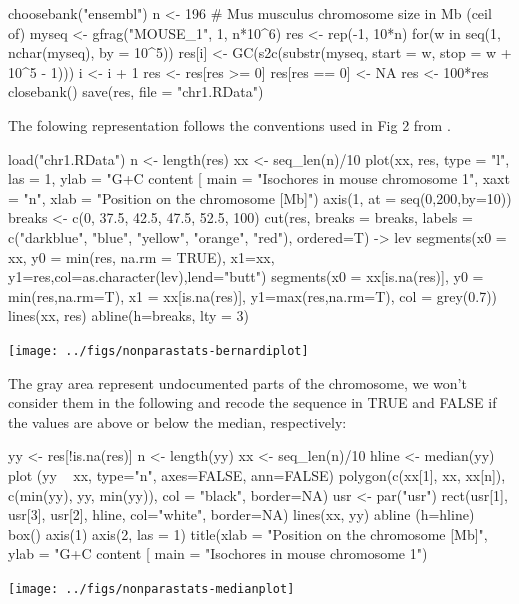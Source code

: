 \documentclass{article}
\begin{document}
%
%
\begin{Schunk}
\begin{Sinput}
 choosebank("ensembl")
 n <- 196 # Mus musculus chromosome size in Mb (ceil of)
 myseq <- gfrag("MOUSE_1", 1, n*10^6)
 res <- rep(-1, 10*n)
 for(w in seq(1, nchar(myseq), by = 10^5)){
   res[i] <- GC(s2c(substr(myseq, start = w, stop = w + 10^5 - 1)))
   i <- i + 1
 }
 res <- res[res >= 0]
 res[res == 0] <- NA
 res <- 100*res
 closebank()
 save(res, file = "chr1.RData")
\end{Sinput}
\end{Schunk}

The folowing representation follows the conventions used in Fig 2 from \cite{PacesJ2004}.

\begin{Schunk}
\begin{Sinput}
 load("chr1.RData")
 n <- length(res)
 xx <- seq_len(n)/10
 plot(xx, res, type = "l", las = 1,
 ylab = "G+C content [%
 main = "Isochores in mouse chromosome 1", xaxt = "n",
 xlab = "Position on the chromosome [Mb]")
 axis(1, at = seq(0,200,by=10))
 breaks <- c(0, 37.5, 42.5, 47.5, 52.5, 100)
 cut(res, breaks = breaks, 
 labels = c("darkblue", "blue", "yellow", "orange", "red"),
 ordered=T) -> lev
 segments(x0 = xx, y0 = min(res, na.rm = TRUE), x1=xx, y1=res,col=as.character(lev),lend="butt")
 segments(x0 = xx[is.na(res)], y0 = min(res,na.rm=T), x1 = xx[is.na(res)], y1=max(res,na.rm=T),
 col = grey(0.7))
 lines(xx, res)
 abline(h=breaks, lty = 3)
\end{Sinput}
\end{Schunk}
\texttt{[image: ../figs/nonparastats-bernardiplot]}

The gray area represent undocumented parts of the chromosome, we won't
consider them in the following and recode the sequence in TRUE and FALSE
if the values are above or below the median, respectively:

\begin{Schunk}
\begin{Sinput}
 yy <- res[!is.na(res)]
 n <- length(yy)
 xx <- seq_len(n)/10
 hline <- median(yy)
 plot (yy ~ xx, type="n", axes=FALSE, ann=FALSE)
 polygon(c(xx[1], xx, xx[n]), c(min(yy), yy, min(yy)), col = "black", border=NA)
 usr <- par("usr")
 rect(usr[1], usr[3], usr[2], hline, col="white", border=NA)
 lines(xx, yy)
 abline (h=hline)
 box()
 axis(1)
 axis(2, las = 1) 
 title(xlab = "Position on the chromosome [Mb]", ylab = "G+C content [%
 main = "Isochores in mouse chromosome 1")
\end{Sinput}
\end{Schunk}
\texttt{[image: ../figs/nonparastats-medianplot]}
\end{document}
